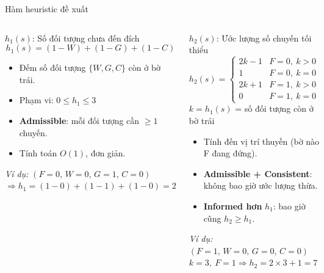 \documentclass[aspectratio=169,10pt]{beamer}
\begin{document}
\begin{frame}{Hàm heuristic đề xuất}
\begin{columns}[T,onlytextwidth]
\begin{block}{$h_1(s)$: Số đối tượng chưa đến đích}
\[
  h_1(s) = (1{-}W) + (1{-}G) + (1{-}C)
\]
\begin{itemize}
  \item Đếm số đối tượng $\{W,G,C\}$ còn ở bờ trái.
  \item Phạm vi: $0 \leq h_1 \leq 3$
  \item \textbf{Admissible}: mỗi đối tượng cần $\geq 1$ chuyến.
  \item Tính toán $O(1)$, đơn giản.
\end{itemize}
\textcolor{Primary}{\textit{Ví dụ:}} $(F{=}0,\,W{=}0,\,G{=}1,\,C{=}0)$\\
$\Rightarrow h_1 = (1{-}0)+(1{-}1)+(1{-}0) = 2$
\end{block}

\begin{block}{$h_2(s)$: Ước lượng số chuyến tối thiểu}
\[
  h_2(s) = \begin{cases}
    2k - 1 & F=0,\ k > 0 \\
    1       & F=0,\ k = 0 \\
    2k + 1  & F=1,\ k > 0 \\
    0       & F=1,\ k = 0
  \end{cases}
\]
{\scriptsize $k = h_1(s)$ = số đối tượng còn ở bờ trái}
\begin{itemize}
  \item Tính đến vị trí thuyền (bờ nào F đang đứng).
  \item \textbf{Admissible + Consistent}: không bao giờ ước lượng thừa.
  \item \textbf{Informed hơn} $h_1$: bao giờ cũng $h_2 \geq h_1$.
\end{itemize}
\textcolor{Primary}{\textit{Ví dụ:}} $(F{=}1,\,W{=}0,\,G{=}0,\,C{=}0)$\\
$k=3,\ F=1 \Rightarrow h_2 = 2{\times}3+1 = 7$
\end{block}
\end{columns}
\vspace{0.2cm}
\centering
{}
\end{frame}
\end{document}
